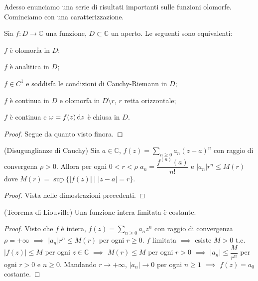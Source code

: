 Adesso enunciamo una serie di risultati importanti sulle funzioni olomorfe. Cominciamo con una caratterizzazione.

\begin{thm}
  Sia $f:D \longrightarrow \mathbb{C}$ una funzione, $D \subset \mathbb{C}$ un aperto. Le seguenti sono equivalenti:
  \begin{nlist}
    \item $f$ è olomorfa in $D$;
    \item $f$ è analitica in $D$;
    \item $f \in C^1$ e soddisfa le condizioni di Cauchy-Riemann in $D$;
    \item $f$ è continua in $D$ e olomorfa in $D\setminus r$, $r$ retta orizzontale;
    \item $f$ è continua e $\omega=f(z)\mathop{}\!\mathrm{d} z$ è chiusa in $D$.
  \end{nlist}
\end{thm}

\begin{proof}
  Segue da quanto visto finora.
\end{proof}

\begin{cor}
  (Disuguaglianze di Cauchy) Sia $a \in \mathbb{C}$, $\displaystyle f(z)=\sum_{n \ge 0} a_n(z-a)^n$ con raggio di convergena $\rho>0$. Allora per ogni $0 <r<\rho$ $a_n=\dfrac{f^{(n)}(a)}{n!}$ e $|a_n|r^n \le M(r)$ dove $M(r)=\sup\{|f(z)| \mid |z-a|=r\}$.
\end{cor}

\begin{proof}
  Vista nelle dimostrazioni precedenti.
\end{proof}

\begin{thm}
  (Teorema di Liouville) Una funzione intera limitata è costante.
\end{thm}

\begin{proof}
  Visto che $f$ è intera, $\displaystyle f(z)=\sum_{n \ge 0} a_nz^n$ con raggio di convergenza $\rho=+\infty$ $\implies$ $|a_n|r^n \le M(r)$ per ogni $r \ge 0$.
  $f$ limitata $\implies$ esiste $M>0$ t.c. $|f(z)| \le M$ per ogni $z \in \mathbb{C}$ $\implies$ $M(r) \le M$ per ogni $r>0$ $\implies$ $|a_n| \le \dfrac{M}{r^n}$ per ogni $r>0$ e $n \ge 0$.
  Mandando $r \longrightarrow +\infty$, $|a_n| \longrightarrow 0$ per ogni $n \ge 1$ $\implies$ $f(z)=a_0$ costante.
\end{proof}

